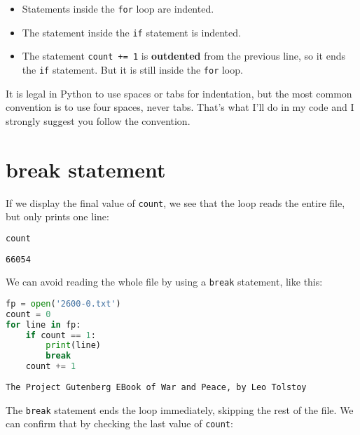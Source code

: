 \begin{itemize}
\item
  Statements inside the \passthrough{\lstinline!for!} loop are indented.
\item
  The statement inside the \passthrough{\lstinline!if!} statement is
  indented.
\item
  The statement \passthrough{\lstinline!count += 1!} is
  \textbf{outdented} from the previous line, so it ends the
  \passthrough{\lstinline!if!} statement. But it is still inside the
  \passthrough{\lstinline!for!} loop.
\end{itemize}

It is legal in Python to use spaces or tabs for indentation, but the
most common convention is to use four spaces, never tabs. That's what
I'll do in my code and I strongly suggest you follow the convention.

\hypertarget{break-statement}{%
\section{break statement}\label{break-statement}}

If we display the final value of \passthrough{\lstinline!count!}, we see
that the loop reads the entire file, but only prints one line:

\begin{lstlisting}[language=Python]
count
\end{lstlisting}

\begin{lstlisting}[]
66054
\end{lstlisting}

We can avoid reading the whole file by using a
\passthrough{\lstinline!break!} statement, like this:

\begin{lstlisting}[language=Python]
fp = open('2600-0.txt')
count = 0
for line in fp:
    if count == 1:
        print(line)
        break
    count += 1
\end{lstlisting}

\begin{lstlisting}[]
The Project Gutenberg EBook of War and Peace, by Leo Tolstoy
\end{lstlisting}

The \passthrough{\lstinline!break!} statement ends the loop immediately,
skipping the rest of the file. We can confirm that by checking the last
value of \passthrough{\lstinline!count!}:

